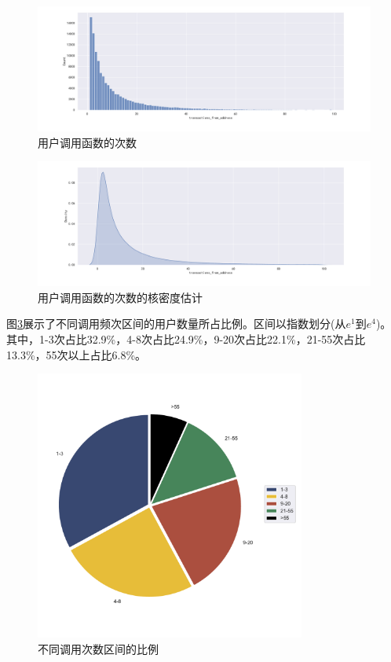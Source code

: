 \documentclass{myreport}
\begin{document}
\begin{figure}[!htbp]
	\centering
	\includegraphics[width=\linewidth]{figure/User Count hist.pdf}
	\caption{用户调用函数的次数}
	\label{fig:User Count hist}
\end{figure}
\begin{figure}[!htbp]
	\centering
	\includegraphics[width=\linewidth]{figure/User Count kde.pdf}
	\caption{用户调用函数的次数的核密度估计}
	\label{fig:User Count kde}
\end{figure}

图\ref{fig:User Count pie}展示了不同调用频次区间的用户数量所占比例。区间以指数划分(从$e^1$到$e^4$)。其中，1-3次占比32.9\%，4-8次占比24.9\%，9-20次占比22.1\%，21-55次占比13.3\%，55次以上占比6.8\%。

\begin{figure}[!htbp]
	\centering
	\includegraphics[width=3.5in]{figure/User Count pie.pdf}
	\caption{不同调用次数区间的比例}
	\label{fig:User Count pie}
\end{figure}
\end{document}
